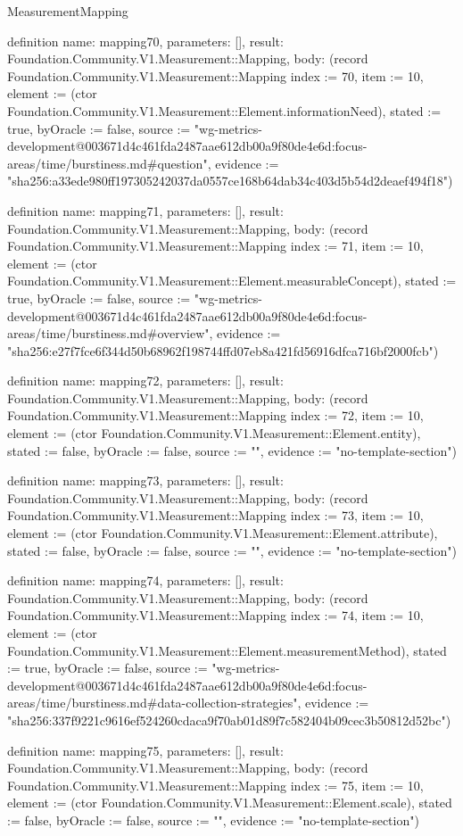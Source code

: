 \begin{lexlean}{MeasurementMapping}
\begin{semanticmodule}
definition{
  name: mapping70,
  parameters: [],
  result: Foundation.Community.V1.Measurement::Mapping,
  body: (record Foundation.Community.V1.Measurement::Mapping {index := 70, item := 10, element := (ctor Foundation.Community.V1.Measurement::Element.informationNeed), stated := true, byOracle := false, source := "wg-metrics-development@003671d4c461fda2487aae612db00a9f80de4e6d:focus-areas/time/burstiness.md#question", evidence := "sha256:a33ede980ff197305242037da0557ce168b64dab34c403d5b54d2deaef494f18"})
}

definition{
  name: mapping71,
  parameters: [],
  result: Foundation.Community.V1.Measurement::Mapping,
  body: (record Foundation.Community.V1.Measurement::Mapping {index := 71, item := 10, element := (ctor Foundation.Community.V1.Measurement::Element.measurableConcept), stated := true, byOracle := false, source := "wg-metrics-development@003671d4c461fda2487aae612db00a9f80de4e6d:focus-areas/time/burstiness.md#overview", evidence := "sha256:e27f7fce6f344d50b68962f198744ffd07eb8a421fd56916dfca716bf2000fcb"})
}

definition{
  name: mapping72,
  parameters: [],
  result: Foundation.Community.V1.Measurement::Mapping,
  body: (record Foundation.Community.V1.Measurement::Mapping {index := 72, item := 10, element := (ctor Foundation.Community.V1.Measurement::Element.entity), stated := false, byOracle := false, source := "", evidence := "no-template-section"})
}

definition{
  name: mapping73,
  parameters: [],
  result: Foundation.Community.V1.Measurement::Mapping,
  body: (record Foundation.Community.V1.Measurement::Mapping {index := 73, item := 10, element := (ctor Foundation.Community.V1.Measurement::Element.attribute), stated := false, byOracle := false, source := "", evidence := "no-template-section"})
}

definition{
  name: mapping74,
  parameters: [],
  result: Foundation.Community.V1.Measurement::Mapping,
  body: (record Foundation.Community.V1.Measurement::Mapping {index := 74, item := 10, element := (ctor Foundation.Community.V1.Measurement::Element.measurementMethod), stated := true, byOracle := false, source := "wg-metrics-development@003671d4c461fda2487aae612db00a9f80de4e6d:focus-areas/time/burstiness.md#data-collection-strategies", evidence := "sha256:337f9221c9616ef524260cdaca9f70ab01d89f7c582404b09cec3b50812d52bc"})
}

definition{
  name: mapping75,
  parameters: [],
  result: Foundation.Community.V1.Measurement::Mapping,
  body: (record Foundation.Community.V1.Measurement::Mapping {index := 75, item := 10, element := (ctor Foundation.Community.V1.Measurement::Element.scale), stated := false, byOracle := false, source := "", evidence := "no-template-section"})
}


\end{semanticmodule}
\end{lexlean}
